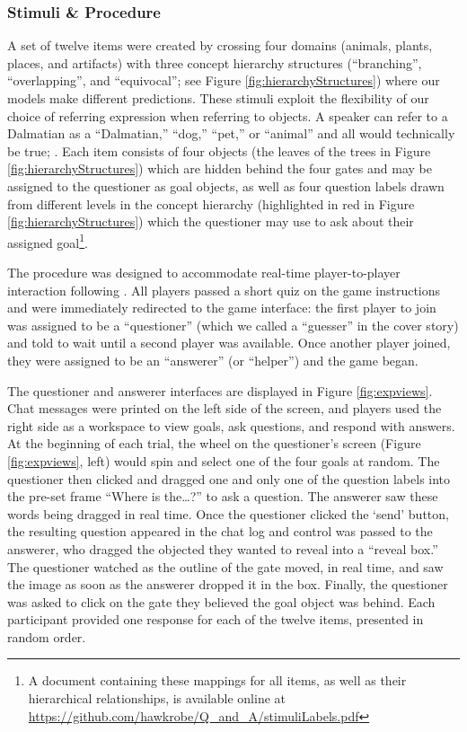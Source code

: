 \documentclass[12pt, floatsintext, jou]{apa6}
\begin{document}
\subsubsection{Stimuli \& Procedure} A set of twelve items were created by crossing four domains (animals, plants, places, and artifacts) with three concept hierarchy structures (``branching'', ``overlapping'', and ``equivocal''; see Figure \ref{fig:hierarchyStructures}) where our models make different predictions. These stimuli exploit the flexibility of our choice of referring expression when referring to objects. A speaker can refer to a Dalmatian as a ``Dalmatian,'' ``dog,'' ``pet,'' or ``animal'' and all would technically be true; . Each item consists of four objects (the leaves of the trees in Figure \ref{fig:hierarchyStructures}) which are hidden behind the four gates and may be assigned to the questioner as goal objects, as well as four question labels drawn from different levels in the concept hierarchy (highlighted in red in Figure \ref{fig:hierarchyStructures}) which the questioner may use to ask about their assigned goal\footnote{A document containing these mappings for all items, as well as their hierarchical relationships, is available online at \scriptsize\url{https://github.com/hawkrobe/Q\_and\_A/stimuliLabels.pdf}}.

The procedure was designed to accommodate real-time player-to-player interaction following . All players passed a short quiz on the game instructions and were immediately redirected to the game interface: the first player to join was assigned to be a ``questioner'' (which we called a ``guesser'' in the cover story) and told to wait until a second player was available. Once another player joined, they were assigned to be an ``answerer'' (or ``helper'') and the game began. 

The questioner and answerer interfaces are displayed in Figure \ref{fig:expviews}. Chat messages were printed on the left side of the screen, and players used the right side as a workspace to view goals, ask questions, and respond with answers. At the beginning of each trial, the wheel on the questioner's screen (Figure \ref{fig:expviews}, left) would spin and select one of the four goals at random. The questioner then clicked and dragged one and only one of the question labels into the pre-set frame ``Where is the\dots?'' to ask a question. The answerer saw these words being dragged in real time. Once the questioner clicked the `send' button, the resulting question appeared in the chat log and control was passed to the answerer, who dragged the objected they wanted to reveal into a ``reveal box.'' The questioner watched as the outline of the gate moved, in real time, and saw the image as soon as the answerer dropped it in the box. Finally, the questioner was asked to click on the gate they believed the goal object was behind. Each participant provided one response for each of the twelve items, presented in random order. 
\end{document}
